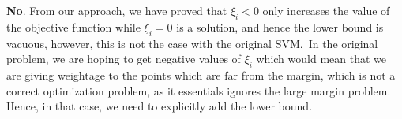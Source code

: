 \documentclass[a4paper,11pt]{article}
\begin{document}
\begin{mlsolution}
\begin{qpart}{4}
    \end{qpart}

    \begin{qpart}{5}

        \textbf{No}. From our approach, we have proved that $\xi_i < 0$ only increases the value of the objective function while $\xi_i = 0$ is a solution, and hence the lower bound is vacuous, however, this is not the case with the original SVM.\ In the original problem, we are hoping to get negative values of $\xi_i$ which would mean that we are giving weightage to the points which are far from the margin, which is not a correct optimization problem, as it essentials ignores the large margin problem. Hence, in that case, we need to explicitly add the lower bound.

    \end{qpart}

\end{mlsolution}

\begin{mlsolution}
    
\end{mlsolution}
\end{document}
